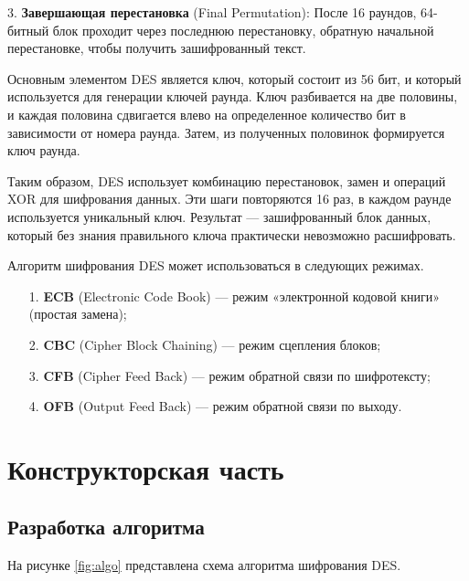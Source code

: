 3. \textbf{Завершающая перестановка} (Final Permutation):
После 16 раундов, 64-битный блок проходит через последнюю перестановку, обратную начальной перестановке, чтобы получить зашифрованный текст.

Основным элементом DES является ключ, который состоит из 56 бит, и который используется для генерации ключей раунда. Ключ разбивается на две половины, и каждая половина сдвигается влево на определенное количество бит в зависимости от номера раунда. Затем, из полученных половинок формируется ключ раунда.

Таким образом, DES использует комбинацию перестановок, замен и операций XOR для шифрования данных. Эти шаги повторяются 16 раз, в каждом раунде используется уникальный ключ. Результат --- зашифрованный блок данных, который без знания правильного ключа практически невозможно расшифровать.

Алгоритм шифрования DES может использоваться в следующих режимах.

\begin{enumerate}
	\item[1.] \textbf{ECB} (Electronic Code Book) --- режим «электронной кодовой книги» (простая замена);
	\item[2.] \textbf{CBC} (Cipher Block Chaining) --- режим сцепления блоков;
	\item[3.] \textbf{CFB} (Cipher Feed Back) --- режим обратной связи по шифротексту;
	\item[4.] \textbf{OFB} (Output Feed Back) --- режим обратной связи по выходу.
\end{enumerate}

\clearpage

\section{Конструкторская часть}

\subsection{Разработка алгоритма}

На рисунке \ref{fig:algo} представлена схема алгоритма шифрования DES.

%

